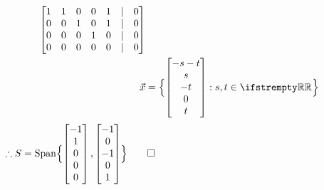 \documentclass[12pt, a4paper]{article}
\begin{document}
\begin{enumerate}[Q\arabic*.]
\begin{enumerate}[(\alph*)]
\begin{align*}
          \begin{bmatrix}
            1&1&0&0&1&|&0\\
            0&0&1&0&1&|&0\\
            0&0&0&1&0&|&0\\
            0&0&0&0&0&|&0
          \end{bmatrix}\\
          \vec{x} &= \Bigl\{\begin{bmatrix}-s-t\\s\\-t\\0\\t\end{bmatrix}: s, t \in \RR \Bigr\}
        \end{align*}
        $\therefore S = \operatorname{Span}\Bigl\{\begin{bmatrix}-1\\1\\0\\0\\0\end{bmatrix}, \begin{bmatrix}-1\\0\\-1\\0\\1\end{bmatrix} \Bigr\} \qed$
    \end{enumerate}
\end{enumerate}
\end{document}
